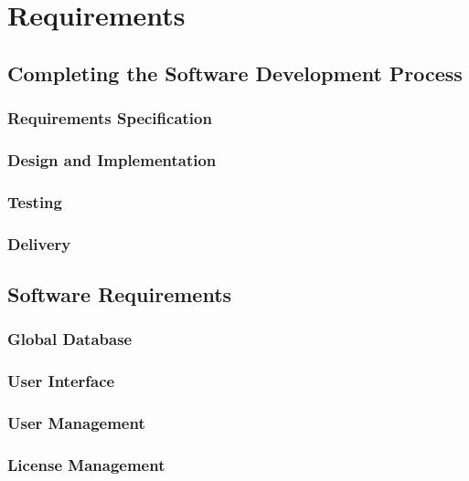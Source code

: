 \documentclass[11pt]{article}
\begin{document}
\newpage
\section{Requirements}

\subsection{Completing the Software Development Process}

\subsubsection{Requirements Specification}

\subsubsection{Design and Implementation}

\subsubsection{Testing}

\subsubsection{Delivery}

\subsection{Software Requirements}

\subsubsection{Global Database}

\subsubsection{User Interface}

\subsubsection{User Management}

\subsubsection{License Management}
\end{document}
